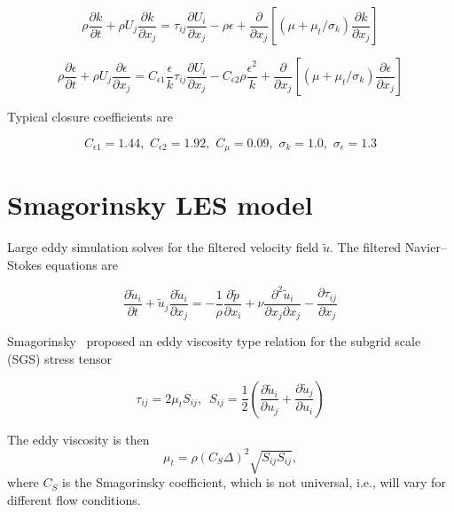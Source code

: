 \begin{equation}
    \rho \frac{\partial k}{\partial t}
    + \rho U_j \frac{\partial k}{\partial x_j}
    = \tau_{ij} \frac{\partial U_i}{\partial x_j}
    - \rho \epsilon
    + \frac{\partial}{\partial x_j}
    \left[
    (\mu + \mu_t/\sigma_k) \frac{\partial k}{\partial x_j}
    \right]
    \label{eq:kepsilon-k}
\end{equation}

\begin{equation}
    \rho \frac{\partial \epsilon}{\partial t}
    + \rho U_j \frac{\partial \epsilon}{\partial x_j}
    = C_{\epsilon 1} \frac{\epsilon}{k} \tau_{ij}
    \frac{\partial U_i}{\partial x_j}
    - C_{\epsilon 2} \rho \frac{\epsilon^2}{k}
    + \frac{\partial}{\partial x_j}
    \left[
    (\mu + \mu_t/\sigma_k) \frac{\partial \epsilon}{\partial x_j}
    \right]
    \label{eq:kepsilon-epsilon}
\end{equation}

Typical closure coefficients are

\begin{equation}
    C_{\epsilon 1} = 1.44, \, \,
    C_{\epsilon 2} = 1.92, \, \,
    C_\mu = 0.09, \, \,
    \sigma_k = 1.0, \, \,
    \sigma_\epsilon = 1.3
\end{equation}


\section{Smagorinsky LES model}

Large eddy simulation solves for the filtered velocity field $\tilde{u}$. The
filtered Navier--Stokes equations are


\begin{equation}
    \frac{\partial \tilde{u}_i}{\partial t}
    + \tilde{u}_j \frac{\partial \tilde{u}_i}{\partial x_j}
    = - \frac{1}{\rho} \frac{\partial \tilde{p}}{\partial x_i}
    + \nu \frac{\partial^2 \tilde{u}_i}{\partial x_j \partial x_j}
    - \frac{\partial \tau_{ij}}{\partial x_j}
    \label{eq:filtered-ns}
\end{equation}

Smagorinsky~\cite{Smagorinsky1963} proposed an eddy viscosity type relation for
the subgrid scale (SGS) stress tensor

\begin{equation}
    \tau_{ij} = 2 \mu_t S_{ij}, \, \, \,
    S_{ij} = \frac{1}{2}
    \left(
    \frac{\partial \tilde{u}_i}{\partial u_j}
    + \frac{\partial \tilde{u}_j}{\partial u_i}
    \right)
\end{equation}

The eddy viscosity is then
\begin{equation}
    \mu_t = \rho (C_S \Delta)^2 \sqrt{S_{ij} S_{ij}},
\end{equation}
where $C_S$ is the Smagorinsky coefficient, which is not universal, i.e., will
vary for different flow conditions.

